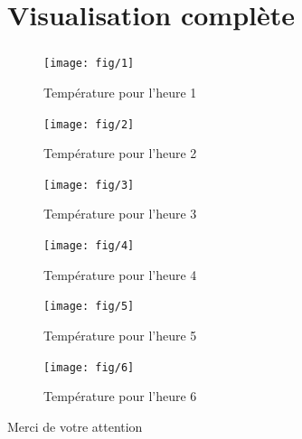 \documentclass{beamer}
\begin{document}
\section{Visualisation complète}

\begin{frame} \frametitle{}

  \begin{overprint}

     \begin{figure}
      \centering
      \texttt{[image: fig/1]}
      \caption{Température pour l'heure 1}
    \end{figure}

     \begin{figure}
      \centering
      \texttt{[image: fig/2]}
      \caption{Température pour l'heure 2}
    \end{figure}

     \begin{figure}
      \centering
      \texttt{[image: fig/3]}
      \caption{Température pour l'heure 3}
    \end{figure}

     \begin{figure}
      \centering
      \texttt{[image: fig/4]}
      \caption{Température pour l'heure 4}
    \end{figure}

     \begin{figure}
      \centering
      \texttt{[image: fig/5]}
      \caption{Température pour l'heure 5}
    \end{figure}

     \begin{figure}
      \centering
      \texttt{[image: fig/6]}
      \caption{Température pour l'heure 6}
    \end{figure}

  \end{overprint}

\end{frame}

\begin{frame}{}
  \centering
  Merci de votre attention
\end{frame}
\end{document}
